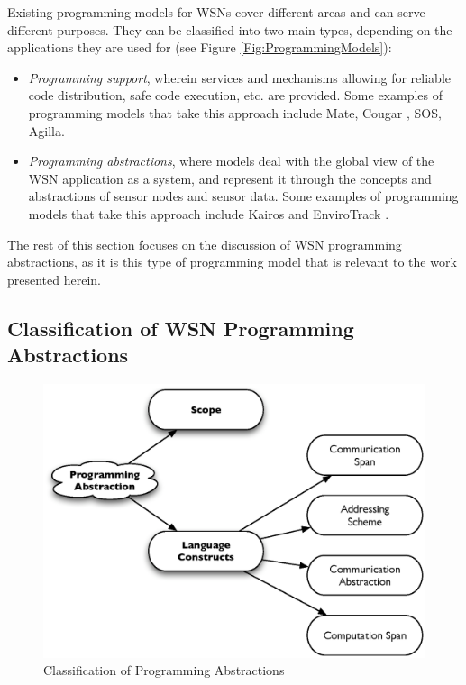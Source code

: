 Existing programming models for WSNs cover different areas and can serve 
different purposes. They can be classified into two main types, depending on 
the applications they are used for  \cite{hadim_middleware:2006} (see Figure
\ref{Fig:ProgrammingModels}):
\begin{itemize}
\item \emph{Programming support}, wherein services and mechanisms allowing for 
reliable code distribution, safe code execution, etc. are provided. Some
examples of programming models that take this approach include Mate\cite{Levis_Mate:2002},
Cougar \cite{Bonnet_Cougar:2001}, SOS\cite{Han_SOS:2005}, Agilla\cite{Fok_Agilla:2005}.
\item \emph{Programming abstractions}, where models deal with the global view 
of the WSN application as a system, and represent it through the concepts and 
abstractions of sensor nodes and sensor data. Some
examples of programming models that take this approach include Kairos
\cite{gummadi_Kairos:2005} and
EnviroTrack \cite{Abdelzaher_EnviroTrack:2004} .
\end{itemize}

The rest of this section focuses on the discussion of WSN programming
abstractions, as it is this type of programming model that is relevant to the
work presented herein.

\subsection{Classification of WSN Programming Abstractions}

\begin{figure}
\centering
\label{Fig:ProgrAbstrClassification}
\includegraphics[scale=0.6]{img/ProgAbstr_Classification.eps}
\caption{Classification of Programming Abstractions} 
\end{figure} 

